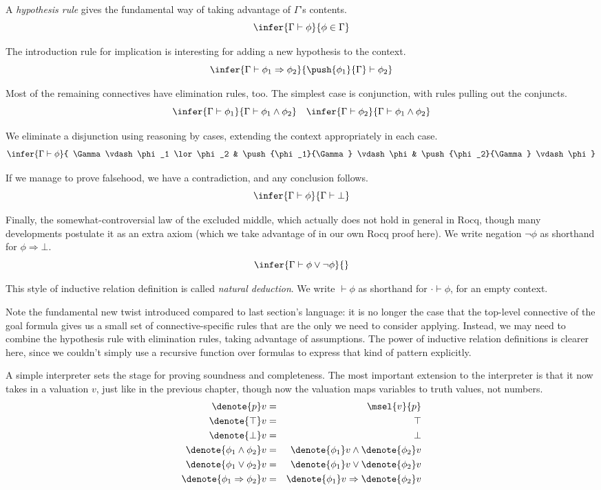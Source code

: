\documentclass{amsbook}
\theoremstyle{definition}
\theoremstyle{remark}
\numberwithin{section}{chapter}
\numberwithin{equation}{chapter}
\begin{document}
A \emph{hypothesis rule} gives the fundamental way of taking advantage of $\Gamma$'s contents.
$$\infer{\Gamma \vdash \phi}{
  \phi \in \Gamma
}$$

The introduction rule for implication is interesting for adding a new hypothesis to the context.
$$\infer{\Gamma \vdash \phi_1 \Rightarrow \phi_2}{
  \push{\phi_1}{\Gamma} \vdash \phi_2
}$$

Most of the remaining connectives have elimination rules, too.
The simplest case is conjunction, with rules pulling out the conjuncts.
$$\infer{\Gamma \vdash \phi_1}{
  \Gamma \vdash \phi_1 \land \phi_2
}
\quad \infer{\Gamma \vdash \phi_2}{
  \Gamma \vdash \phi_1 \land \phi_2
}$$

We eliminate a disjunction using reasoning by cases, extending the context appropriately in each case.
$$\infer{\Gamma \vdash \phi}{
  \Gamma \vdash \phi_1 \lor \phi_2
  & \push{\phi_1}{\Gamma} \vdash \phi
  & \push{\phi_2}{\Gamma} \vdash \phi
}$$

If we manage to prove falsehood, we have a contradiction, and any conclusion follows.
$$\infer{\Gamma \vdash \phi}{
  \Gamma \vdash \bot
}$$

Finally, the somewhat-controversial law of the excluded middle, which actually does not hold in general in Rocq, though many developments postulate it as an extra axiom (which we take advantage of in our own Rocq proof here).
We write negation $\neg \phi$ as shorthand for $\phi \Rightarrow \bot$.
$$\infer{\Gamma \vdash \phi \lor \neg \phi}{}$$

This style of inductive relation definition is called \emph{natural deduction}.
We write $\vdash \phi$ as shorthand for $\cdot \vdash \phi$, for an empty context.

Note the fundamental new twist introduced compared to last section's language: it is no longer the case that the top-level connective of the goal formula gives us a small set of connective-specific rules that are the only we need to consider applying.
Instead, we may need to combine the hypothesis rule with elimination rules, taking advantage of assumptions.
The power of inductive relation definitions is clearer here, since we couldn't simply use a recursive function over formulas to express that kind of pattern explicitly.

A simple interpreter sets the stage for proving soundness and completeness.
The most important extension to the interpreter is that it now takes in a valuation $v$, just like in the previous chapter, though now the valuation maps variables to truth values, not numbers.
\begin{eqnarray*}
  \denote{p}v &=& \msel{v}{p} \\
  \denote{\top}v &=& \top \\
  \denote{\bot}v &=& \bot \\
  \denote{\phi_1 \land \phi_2}v &=& \denote{\phi_1}v \land \denote{\phi_2}v \\
  \denote{\phi_1 \lor \phi_2}v &=& \denote{\phi_1}v \lor \denote{\phi_2}v \\
  \denote{\phi_1 \Rightarrow \phi_2}v &=& \denote{\phi_1}v \Rightarrow \denote{\phi_2}v
\end{eqnarray*}
\end{document}
